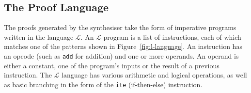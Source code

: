 \documentclass[a4paper]{llncs}
\newcommand{\todo}[1]{{\bf TODO:} #1}
\newcommand{\newC}{C$^-$\xspace}
\begin{document}


\subsection{The Proof Language}

The proofs generated by the synthesiser take the form of imperative programs
written in the language $\mathcal{L}$.  An $\mathcal{L}$-program is a list
of instructions, each of which matches one of the patterns shown in
Figure~\ref{fig:l-language}.  An instruction has an opcode (such as
\verb|add| for addition) and one or more operands.  An operand is either a
constant, one of the program's inputs or the result of a previous
instruction.  The $\mathcal{L}$ language has various arithmetic and logical
operations, as well as basic branching in the form of the \verb|ite|
(if-then-else) instruction.





\end{document}
